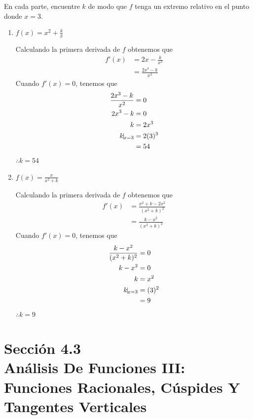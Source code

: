 \documentclass[12pt]{article}
\begin{document}
En cada parte, encuentre $k$ de modo que $f$ tenga un extremo relativo en el punto donde $x = 3$.
\begin{enumerate}[label=(\alph*)]
\item $f(x)=x^2+\frac{k}{x}$

  Calculando la primera derivada de $f$ obtenemos que
  \begin{align*}
    f'(x)
    &= 2x-\frac{k}{x^2} \\
    &= \frac{2x^3-k}{x^2}
  \end{align*}
  Cuando $f'(x)=0$, tenemos que
  \begin{align*}
    \frac{2x^3-k}{x^2}
    &=0\\
    2x^3-k
    &=0\\
    k
    &=2x^3\\
    k\vline_{x=3}
    &= 2(3)^3\\
    &=54
  \end{align*}
  $\therefore k=54$

\item $f(x)=\frac{x}{x^2+k}$
  

  Calculando la primera derivada de $f$ obtenemos que
  \begin{align*}
    f'(x)
    &= \frac{x^2+k-2x^2}{(x^2+k)^2}\\
    &= \frac{k-x^2}{(x^2+k)^2}
  \end{align*}
  Cuando $f'(x)=0$, tenemos que
  \begin{align*}
    \frac{k-x^2}{(x^2+k)^2}
    &=0\\
    k-x^2
    &=0\\
    k
    &=x^2\\
    k\vline_{x=3}
    &= (3)^2\\
    &=9
  \end{align*}
  $\therefore k=9$
\end{enumerate}

\section{Sección 4.3 \\  Análisis De Funciones III: Funciones Racionales, Cúspides Y Tangentes Verticales}
\end{document}
